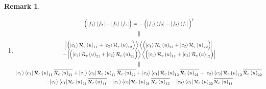 \documentclass[aps,preprint]{revtex4}%
\newtheorem{remark}[theorem]{Remark}
\begin{document}
\begin{remark}
\begin{enumerate}
\item \label{07/02/2025}%
\begin{gather}
\left(  \overset{}{\left\vert f_{1}\right\rangle \left\langle f_{2}\right\vert
-\left\vert f_{2}\right\rangle \left\langle f_{1}\right\vert }\right)
=-\left(  \overset{}{\left\vert f_{1}\right\rangle \left\langle f_{2}%
\right\vert -\left\vert f_{2}\right\rangle \left\langle f_{1}\right\vert
}\right)  ^{\dagger}\\
\parallel\\
\overset{}{%
\begin{array}
[c]{c}%
\left\vert \left(  \overset{}{\left\vert c_{1}\right\rangle \mathcal{R}%
_{c}\left(  u\right)  _{11}+\left\vert c_{2}\right\rangle \mathcal{R}%
_{c}\left(  u\right)  _{12}}\right)  \right\rangle \left\langle \left(
\overset{}{\left\vert c_{1}\right\rangle \mathcal{R}_{c}\left(  u\right)
_{21}+\left\vert c_{2}\right\rangle \mathcal{R}_{c}\left(  u\right)  _{22}%
}\right)  \right\vert \\
-\left\vert \left(  \overset{}{\left\vert c_{1}\right\rangle \mathcal{R}%
_{c}\left(  u\right)  _{21}+\left\vert c_{2}\right\rangle \mathcal{R}%
_{c}\left(  u\right)  _{22}}\right)  \right\rangle \left\langle \left(
\overset{}{\left\vert c_{1}\right\rangle \mathcal{R}_{c}\left(  u\right)
_{11}+\left\vert c_{2}\right\rangle \mathcal{R}_{c}\left(  u\right)  _{12}%
}\right)  \right\vert
\end{array}
}\\
\parallel\\
\left\vert c_{1}\right\rangle \left\langle c_{1}\right\vert \mathcal{R}%
_{c}\left(  u\right)  _{11}\overline{\mathcal{R}_{c}\left(  u\right)  _{21}%
}+\left\vert c_{1}\right\rangle \left\langle c_{2}\right\vert \mathcal{R}%
_{c}\left(  u\right)  _{11}\overline{\mathcal{R}_{c}\left(  u\right)  _{22}%
}+\left\vert c_{2}\right\rangle \left\langle c_{1}\right\vert \mathcal{R}%
_{c}\left(  u\right)  _{12}\overline{\mathcal{R}_{c}\left(  u\right)  _{21}%
}+\left\vert c_{2}\right\rangle \left\langle c_{2}\right\vert \mathcal{R}%
_{c}\left(  u\right)  _{12}\overline{\mathcal{R}_{c}\left(  u\right)  _{22}}\\
-\left\vert c_{1}\right\rangle \left\langle c_{1}\right\vert \mathcal{R}%
_{c}\left(  u\right)  _{21}\overline{\mathcal{R}_{c}\left(  u\right)  _{11}%
}-\left\vert c_{1}\right\rangle \left\langle c_{2}\right\vert \mathcal{R}%
_{c}\left(  u\right)  _{21}\overline{\mathcal{R}_{c}\left(  u\right)  _{12}%
}-\left\vert c_{2}\right\rangle \left\langle c_{1}\right\vert \mathcal{R}%
_{c}\left(  u\right)  _{22}\overline{\mathcal{R}_{c}\left(  u\right)  _{11}%
}
\end{gather}
\end{enumerate}
\end{remark}
\end{document}
